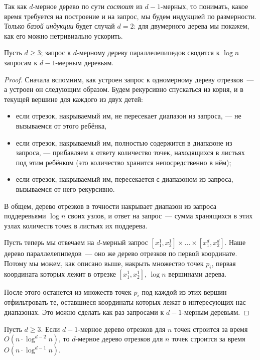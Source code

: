 \documentclass[a4paper,11pt]{article}
\begin{document}
Так как \(d\)-мерное дерево по сути \emph{состоит} из \(d-1\)-мерных,
то понимать, какое время требуется на построение и на запрос,
мы будем индукцией по размерности. Только \emph{базой индукции}
будет случай \(d = 2\): для двумерного дерева мы покажем, как его
можно нетривиально ускорить.

\begin{theorem}
  Пусть \(d \ge 3\); запрос к \(d\)-мерному дереву параллелепипедов
  сводится к \(\log n\) запросам к \(d-1\)-мерным деревьям.
\end{theorem}

\begin{proof}
Сначала вспомним, как устроен запрос к одномерному дереву
отрезков~— а устроен он следующим образом. Будем рекурсивно
спускаться из корня, и в текущей вершине для каждого из двух детей:
\begin{itemize}
  \item если отрезок, накрываемый им, не пересекает диапазон
    из запроса, — не вызываемся от этого ребёнка,
  \item если отрезок, накрываемый им, полностью содержится в диапазоне
    из запроса, — прибавляем к ответу количество точек, находящихся
    в листьях под этим ребёнком (это количество хранится
    непосредственно в нём);
  \item если отрезок, накрываемый им, пересекается с диапазоном
    из запроса, — вызываемся от него рекурсивно.
\end{itemize}

В общем, дерево отрезков в точности накрывает диапазон из запроса
поддеревьями \(\log n\) своих узлов, и ответ на запрос~— сумма
хранящихся в этих узлах количеств точек в листьях их поддерева.

Пусть теперь мы отвечаем на \(d\)-мерный запрос
\([x^1_1, x^1_2] \times \ldots \times [x^d_1, x^d_2]\).
Наше дерево параллелепипедов~— оно же дерево отрезков по первой
координате. Потому мы можем, как описано выше, накрыть множество
точек \(p_i\), первая координата которых лежит в отрезке
\([x^1_1, x^1_2]\), \(\log n\) вершинами дерева.

После этого останется из множеств точек \(p_i\) под каждой
из этих вершин отфильтровать те, оставшиеся координаты которых
лежат в интересующих нас диапазонах. Это можно сделать
как раз запросами к \(d-1\)-мерным деревьям.
\end{proof}

\begin{theorem}
  Пусть \(d \ge 3\). Если \(d-1\)-мерное дерево отрезков
  для \(n\) точек строится за время \(O (n \cdot \log^{d-2} n)\),
  то \(d\)-мерное дерево отрезков для \(n\) точек строится
  за время \(O (n \cdot \log^{d-1} n)\).
\end{theorem}
\end{document}
